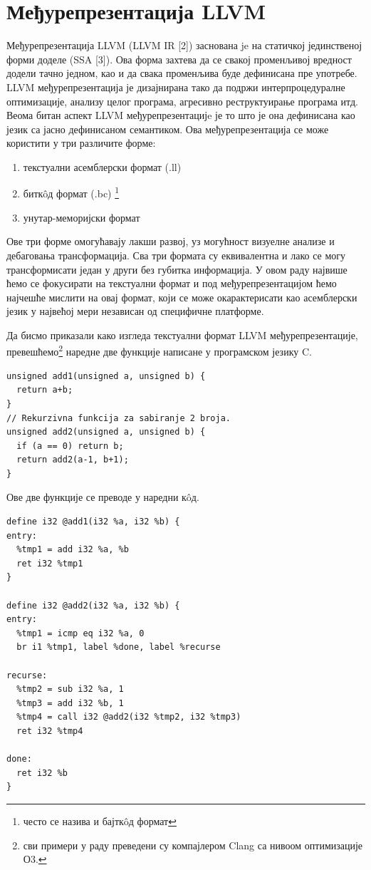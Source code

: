 \documentclass[12pt,oneside]{memoir}
\begin{document}
\section{Међурепрезентација LLVM}
Међурепрезентација LLVM (LLVM IR [2]) заснована je на статичкој 
јединственој форми доделе (SSA [3]).
Ова форма захтева да се свакој променљивој вредност додели тачно једном, као и да
свака променљива буде дефинисана пре употребе.
LLVM међурепрезентација је дизајнирана тако да подржи интерпроцедуралне оптимизације,
анализу целог програма, агресивно реструктуирање програма итд.
Веома битан аспект LLVM међурепрезентацијe је то што је она дефинисана као 
језик са јасно дефинисаном семантиком.
Ова међурепрезентација се може користити у три различите форме: 
\begin{enumerate}
\item текстуални асемблерски формат (.ll)
\item битк\^{o}д  формат (.bc) \footnote{често се назива и бајтк\^{o}д формат}
\item унутар-меморијски формат 
\end{enumerate} 
Ове три форме омогућавају лакши развој, уз могућност
визуелне анализе и дебаговања трансформација. 
Сва три формата су еквивалентна и лако се могу трансформисати један у други без
губитка информација. 
У овом раду највише ћемо се фокусирати на текстуални формат и под међурепрезентацијом
ћемо најчешће мислити на овај формат, који се може окарактерисати као асемблерски 
језик у највећој мери независан од специфичне платформе.

Да бисмо приказали како изгледа текстуални формат LLVM међурепрезентације,
превешћемо\footnote{сви примери у раду преведени су компајлером Clang са нивоом оптимизације О3.} наредне две функције написане у програмском језику C.
\begin{lstlisting}[frame=single]
unsigned add1(unsigned a, unsigned b) {
  return a+b;
}
// Rekurzivna funkcija za sabiranje 2 broja.
unsigned add2(unsigned a, unsigned b) {
  if (a == 0) return b;
  return add2(a-1, b+1);
}
\end{lstlisting}
\pagebreak
Ове две функције се преводе у наредни к\^{o}д.
\begin{lstlisting}[frame=single]
define i32 @add1(i32 %a, i32 %b) {
entry:
  %tmp1 = add i32 %a, %b
  ret i32 %tmp1
}

define i32 @add2(i32 %a, i32 %b) {
entry:
  %tmp1 = icmp eq i32 %a, 0
  br i1 %tmp1, label %done, label %recurse

recurse:
  %tmp2 = sub i32 %a, 1
  %tmp3 = add i32 %b, 1
  %tmp4 = call i32 @add2(i32 %tmp2, i32 %tmp3)
  ret i32 %tmp4

done:
  ret i32 %b
}
\end{lstlisting}
\end{document}
